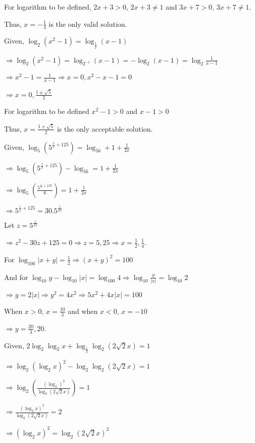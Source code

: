   For logarithm to be defined, $2x + 3 > 0,\,2x + 3\neq 1$ and $3x + 7 > 0,\,3x + 7 \neq 1$.

  Thus, $x = -\frac{1}{4}$ is the only valid solution.
\item Given, $\log_2(x^2 - 1) = \log_{\tfrac{1}{2}}(x - 1)$

  $\Rightarrow \log_2(x^2 - 1) = \log_{2^{-1}}(x - 1) = -\log_2(x - 1) = \log_2\frac{1}{x - 1}$

  $\Rightarrow x^2 - 1 = \frac{1}{x - 1}\Rightarrow x = 0, x^2 - x - 1 = 0$

  $\Rightarrow x = 0, \frac{1\pm\sqrt{5}}{2}$

  For logarithm to be defined $x^2 - 1 > 0$ and $x - 1 > 0$

  Thus, $x = \frac{1+\sqrt{5}}{2}$ is the only acceptable solution.
\item Given, $\log_5\left(5^{\tfrac{1}{x} + 125}\right) = \log_56 + 1 + \frac{1}{2x}$

  $\Rightarrow \log_5\left(5^{\tfrac{1}{x} + 125}\right) - \log_56 = 1 + \frac{1}{2x}$

  $\Rightarrow \log_5\left(\tfrac{5^{\tfrac{1}{x} + 125}}{6}\right) = 1 + \frac{1}{2x}$

  $\Rightarrow 5^{\tfrac{1}{x} + 125} = 30.5^{\tfrac{1}{2x}}$

  Let $z= 5^{\tfrac{1}{2x}}$

  $\Rightarrow z^2 - 30z + 125 = 0 \Rightarrow z = 5, 25 \Rightarrow x = \frac{1}{2}, \frac{1}{4}$.
\item For $\log_{100}|x + y| = \frac{1}{2} \Rightarrow (x + y)^2 = 100$

  And for $\log_{10}y - \log_{10}|x| = \log_{100}4\Rightarrow \log_{10}\frac{y}{|x|} = \log_{10}2$

  $\Rightarrow y = 2|x| \Rightarrow y^2 = 4x^2 \Rightarrow 5x^2 + 4x|x| = 100$

  When $x > 0,\, x = \frac{10}{3}$ and when $x < 0,\,x = -10$

  $\Rightarrow y = \frac{20}{3}, 20$.
\item Given, $2\log_2\log_2x + \log_{\tfrac{1}{2}}\log_2(2\sqrt{2}x) = 1$

  $\Rightarrow \log_2(\log_2x)^2 - \log_2\log_2(2\sqrt{2}x) = 1$

  $\Rightarrow \log_2\left(\frac{(\log_2)^2}{\log_2(2\sqrt{2}x)}\right) = 1$

  $\Rightarrow \frac{(\log_2x)^2}{\log_2(2\sqrt{2}x)} = 2$

  $\Rightarrow (\log_2x)^2 = \log_2(2\sqrt{2}x)^2$

